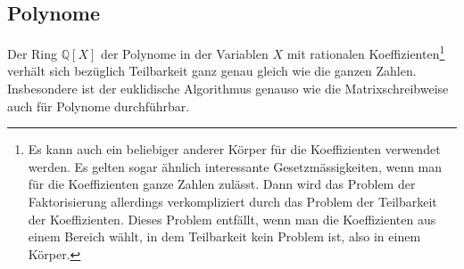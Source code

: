 \subsection{Polynome}
Der Ring $\mathbb{Q}[X]$ der Polynome in der Variablen $X$ mit rationalen
Koeffizienten\footnote{Es kann auch ein beliebiger anderer Körper für
die Koeffizienten verwendet werden.
Es gelten sogar ähnlich interessante Gesetzmässigkeiten, wenn man für
die Koeffizienten ganze Zahlen zulässt.
Dann wird das Problem der Faktorisierung allerdings verkompliziert 
durch das Problem der Teilbarkeit der Koeffizienten.
Dieses Problem entfällt, wenn man die Koeffizienten aus einem
Bereich wählt, in dem Teilbarkeit kein Problem ist, also in einem Körper.}
verhält
sich bezüglich Teilbarkeit ganz genau gleich wie die ganzen Zahlen.
Insbesondere ist der euklidische Algorithmus genauso wie die
Matrixschreibweise auch für Polynome durchführbar.

